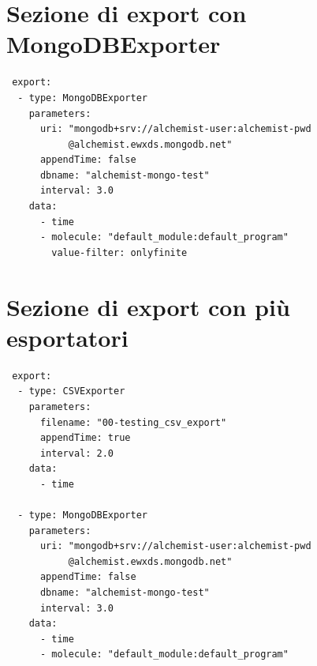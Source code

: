 \documentclass[12pt,a4paper,openright,oneside]{book}
\begin{document}
\section{Sezione di export con MongoDBExporter}
 \begin{verbatim}
 export:
  - type: MongoDBExporter
    parameters:
      uri: "mongodb+srv://alchemist-user:alchemist-pwd
           @alchemist.ewxds.mongodb.net"
      appendTime: false
      dbname: "alchemist-mongo-test"
      interval: 3.0
    data:
      - time
      - molecule: "default_module:default_program"
        value-filter: onlyfinite
\end{verbatim}
\section{Sezione di export con più esportatori}
 \begin{verbatim}
 export:
  - type: CSVExporter
    parameters: 
      filename: "00-testing_csv_export"
      appendTime: true
      interval: 2.0
    data:
      - time
        
  - type: MongoDBExporter
    parameters:
      uri: "mongodb+srv://alchemist-user:alchemist-pwd
           @alchemist.ewxds.mongodb.net"
      appendTime: false
      dbname: "alchemist-mongo-test"
      interval: 3.0
    data:
      - time
      - molecule: "default_module:default_program"

\end{verbatim}
\end{document}
